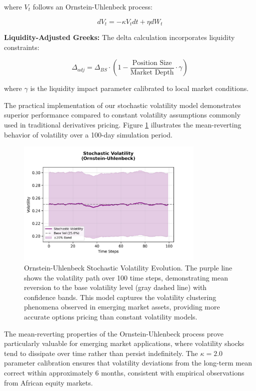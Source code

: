 \documentclass[12pt]{article}
\begin{document}
where $V_t$ follows an Ornstein-Uhlenbeck process:

\begin{equation}
dV_t = -\kappa V_t dt + \eta dW_t
\end{equation}

\textbf{Liquidity-Adjusted Greeks:}
The delta calculation incorporates liquidity constraints:

\begin{equation}
\Delta_{adj} = \Delta_{BS} \cdot \left(1 - \frac{\text{Position Size}}{\text{Market Depth}} \cdot \gamma\right)
\end{equation}

where $\gamma$ is the liquidity impact parameter calibrated to local market conditions.

The practical implementation of our stochastic volatility model demonstrates superior performance compared to constant volatility assumptions commonly used in traditional derivatives pricing. Figure \ref{fig:stochastic_volatility} illustrates the mean-reverting behavior of volatility over a 100-day simulation period.

\begin{figure}[h]
    \centering
    \includegraphics[width=0.8\textwidth]{stochastic_volatility_path.jpeg}
    \caption{Ornstein-Uhlenbeck Stochastic Volatility Evolution. The purple line shows the volatility path over 100 time steps, demonstrating mean reversion to the base volatility level (gray dashed line) with confidence bands. This model captures the volatility clustering phenomena observed in emerging market assets, providing more accurate options pricing than constant volatility models.}
    \label{fig:stochastic_volatility}
\end{figure}

The mean-reverting properties of the Ornstein-Uhlenbeck process prove particularly valuable for emerging market applications, where volatility shocks tend to dissipate over time rather than persist indefinitely. The $\kappa = 2.0$ parameter calibration ensures that volatility deviations from the long-term mean correct within approximately 6 months, consistent with empirical observations from African equity markets.
\end{document}

